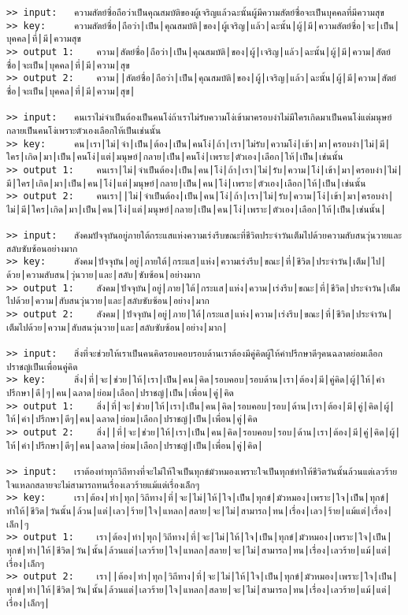 \documentclass[11pt]{article}
\begin{document}
\begin{Verbatim}[commandchars=\\\{\}]
>> input:	ความสัตย์ซื่อถือว่าเป็นคุณสมบัติของผู้เจริญแล้วฉะนั้นผู้มีความสัตย์ซื่อจะเป็นบุคคลที่มีความสุข
>> key:		ความสัตย์ซื่อ|ถือว่า|เป็น|คุณสมบัติ|ของ|ผู้เจริญ|แล้ว|ฉะนั้น|ผู้|มี|ความสัตย์ซื่อ|จะ|เป็น|บุคคล|ที่|มี|ความสุข
>> output 1:	ความ|สัตย์ซื่อ|ถือว่า|เป็น|คุณสมบัติ|ของ|ผู้|เจริญ|แล้ว|ฉะนั้น|ผู้|มี|ความ|สัตย์ซื่อ|จะเป็น|บุคคล|ที่|มี|ความ|สุข
>> output 2:	ความ||สัตย์ซื่อ|ถือว่า|เป็น|คุณสมบัติ|ของ|ผู้|เจริญ|แล้ว|ฉะนั้น|ผู้|มี|ความ|สัตย์ซื่อ|จะเป็น|บุคคล|ที่|มี|ความ|สุข|

>> input:	คนเราไม่จำเป็นต้องเป็นคนโง่ถ้าเราไม่รับความโง่เข้ามาครอบงำไม่มีใครเกิดมาเป็นคนโง่แต่มนุษย์กลายเป็นคนโง่เพราะตัวเองเลือกให้เป็นเช่นนั้น
>> key:		คน|เรา|ไม่|จำ|เป็น|ต้อง|เป็น|คนโง่|ถ้า|เรา|ไม่รับ|ความโง่|เข้า|มา|ครอบงำ|ไม่|มี|ใคร|เกิด|มา|เป็น|คนโง่|แต่|มนุษย์|กลาย|เป็น|คนโง่|เพราะ|ตัวเอง|เลือก|ให้|เป็น|เช่นนั้น
>> output 1:	คนเรา|ไม่|จำเป็นต้อง|เป็น|คน|โง่|ถ้า|เรา|ไม่|รับ|ความ|โง่|เข้า|มา|ครอบงำ|ไม่|มี|ใคร|เกิด|มา|เป็น|คน|โง่|แต่|มนุษย์|กลาย|เป็น|คน|โง่|เพราะ|ตัวเอง|เลือก|ให้|เป็น|เช่นนั้น
>> output 2:	คนเรา||ไม่|จำเป็นต้อง|เป็น|คน|โง่|ถ้า|เรา|ไม่|รับ|ความ|โง่|เข้า|มา|ครอบงำ|ไม่|มี|ใคร|เกิด|มา|เป็น|คน|โง่|แต่|มนุษย์|กลาย|เป็น|คน|โง่|เพราะ|ตัวเอง|เลือก|ให้|เป็น|เช่นนั้น|

>> input:	สังคมปัจจุบันอยู่ภายใต้กระแสแห่งความเร่งรีบขณะที่ชีวิตประจำวันเต็มไปด้วยความสับสนวุ่นวายและสลับซับซ้อนอย่างมาก
>> key:		สังคม|ปัจจุบัน|อยู่|ภายใต้|กระแส|แห่ง|ความเร่งรีบ|ขณะ|ที่|ชีวิต|ประจำวัน|เต็ม|ไป|ด้วย|ความสับสน|วุ่นวาย|และ|สลับ|ซับซ้อน|อย่างมาก
>> output 1:	สังคม|ปัจจุบัน|อยู่|ภาย|ใต้|กระแส|แห่ง|ความ|เร่งรีบ|ขณะ|ที่|ชีวิต|ประจำวัน|เต็มไปด้วย|ความ|สับสนวุ่นวาย|และ|สลับซับซ้อน|อย่าง|มาก
>> output 2:	สังคม||ปัจจุบัน|อยู่|ภาย|ใต้|กระแส|แห่ง|ความ|เร่งรีบ|ขณะ|ที่|ชีวิต|ประจำวัน|เต็มไปด้วย|ความ|สับสนวุ่นวาย|และ|สลับซับซ้อน|อย่าง|มาก|

>> input:	สิ่งที่จะช่วยให้เราเป็นคนคิดรอบคอบรอบด้านเราต้องมีคู่คิดผู้ให้คำปรึกษาดีๆคนฉลาดย่อมเลือกปราชญ์เป็นเพื่อนคู่คิด
>> key:		สิ่ง|ที่|จะ|ช่วย|ให้|เรา|เป็น|คน|คิด|รอบคอบ|รอบด้าน|เรา|ต้อง|มี|คู่คิด|ผู้|ให้|คำปรึกษา|ดี|ๆ|คน|ฉลาด|ย่อม|เลือก|ปราชญ์|เป็น|เพื่อน|คู่|คิด
>> output 1:	สิ่ง|ที่|จะ|ช่วย|ให้|เรา|เป็น|คน|คิด|รอบคอบ|รอบ|ด้าน|เรา|ต้อง|มี|คู่|คิด|ผู้|ให้|คำ|ปรึกษา|ดีๆ|คน|ฉลาด|ย่อม|เลือก|ปราชญ์|เป็น|เพื่อน|คู่|คิด
>> output 2:	สิ่ง||ที่|จะ|ช่วย|ให้|เรา|เป็น|คน|คิด|รอบคอบ|รอบ|ด้าน|เรา|ต้อง|มี|คู่|คิด|ผู้|ให้|คำ|ปรึกษา|ดีๆ|คน|ฉลาด|ย่อม|เลือก|ปราชญ์|เป็น|เพื่อน|คู่|คิด|

>> input:	เราต้องทำทุกวิถีทางที่จะไม่ให้ใจเป็นทุกข์มัวหมองเพราะใจเป็นทุกข์ทำให้ชีวิตวันนั้นล้วนแต่เลวร้ายใจแหลกสลายจะไม่สามารถทนเรื่องเลวร้ายแม้แต่เรื่องเล็กๆ
>> key:		เรา|ต้อง|ทำ|ทุก|วิถีทาง|ที่|จะ|ไม่|ให้|ใจ|เป็น|ทุกข์|มัวหมอง|เพราะ|ใจ|เป็น|ทุกข์|ทำให้|ชีวิต|วันนั้น|ล้วน|แต่|เลว|ร้าย|ใจ|แหลก|สลาย|จะ|ไม่|สามารถ|ทน|เรื่อง|เลว|ร้าย|แม้แต่|เรื่อง|เล็ก|ๆ
>> output 1:	เรา|ต้อง|ทำ|ทุก|วิถีทาง|ที่|จะ|ไม่|ให้|ใจ|เป็น|ทุกข์|มัวหมอง|เพราะ|ใจ|เป็น|ทุกข์|ทำ|ให้|ชีวิต|วัน|นั้น|ล้วนแต่|เลวร้าย|ใจ|แหลก|สลาย|จะ|ไม่|สามารถ|ทน|เรื่อง|เลวร้าย|แม้|แต่|เรื่อง|เล็กๆ
>> output 2:	เรา||ต้อง|ทำ|ทุก|วิถีทาง|ที่|จะ|ไม่|ให้|ใจ|เป็น|ทุกข์|มัวหมอง|เพราะ|ใจ|เป็น|ทุกข์|ทำ|ให้|ชีวิต|วัน|นั้น|ล้วนแต่|เลวร้าย|ใจ|แหลก|สลาย|จะ|ไม่|สามารถ|ทน|เรื่อง|เลวร้าย|แม้|แต่|เรื่อง|เล็กๆ|


\end{Verbatim}
\end{document}
